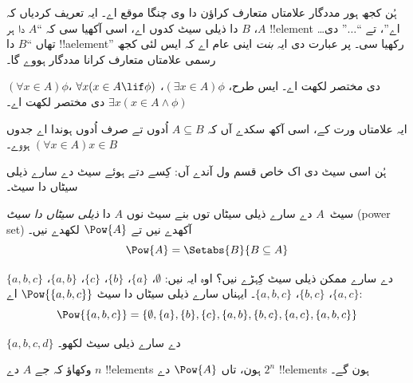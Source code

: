 \documentclass[../../../include/open-logic-section]{subfiles}
\begin{document}
ہُن کجھ ہور مددگار علامتاں متعارف کراؤن دا وی چنگا موقع اے۔ ایہ تعریف
کردیاں کہ $A$، $B$ دا ذیلی سیٹ کدوں اے، اسی آکھیا سی کہ ``$A$ دا ہر
!!{element} \dots اے''، تے ``$\dots$'' دی تھاں ``$B$ دا !!a{element}''
رکھیا سی۔ پر عبارت دی ایہ \emph{بنت} اینی عام اے کہ ایس لئی کجھ رسمی
علامتاں متعارف کرانا مددگار ہووے گا۔

\begin{defn}
$(\forall x \in A)\phi$، $\forall x(x \in A \lif
\phi)$ دی مختصر لکھت اے۔ ایس طرح، $(\exists x \in A)\phi$،
$\exists x(x \in A \land \phi)$ دی مختصر لکھت اے۔
\end{defn}

ایہ علامتاں ورت کے، اسی آکھ سکدے آں کہ $A \subseteq B$ اُدوں تے صرف اُدوں
ہوندا اے جدوں $(\forall x \in A)x \in B$ ہووے۔

ہُن اسی سیٹ دی اک خاص قسم ول آندے آں: کِسے دتے ہوئے سیٹ دے سارے ذیلی
سیٹاں دا سیٹ۔

\begin{defn}
سیٹ~$A$ دے سارے ذیلی سیٹاں توں بنے سیٹ نوں $A$ دا \emph{ذیلی سیٹاں دا سیٹ}
(power set) آکھدے نیں تے $\Pow{A}$ لکھدے نیں۔
  \[
    \Pow{A} = \Setabs{B}{B \subseteq A}
  \]
\end{defn}

\begin{ex}
$\{ a, b, c \}$ دے سارے ممکن ذیلی سیٹ کِہڑے نیں؟ اوہ ایہ نیں:
$\emptyset$، $\{a \}$، $\{b\}$، $\{c\}$، $\{a, b\}$، $\{a, c\}$،
$\{b, c\}$، $\{a, b, c\}$۔ ایہناں سارے ذیلی سیٹاں دا سیٹ
$\Pow{\{a,b,c\}}$ اے:
\[
\Pow{\{ a, b, c \}} = \{\emptyset, \{a \}, \{b\}, \{c\}, \{a, b\},
\{b, c\}, \{a, c\}, \{a, b, c\}\}
\]
\end{ex}

\begin{prob}
$\{a, b, c, d\}$ دے سارے ذیلی سیٹ لکھو۔
\end{prob}

\begin{prob}
وکھاؤ کہ جے $A$ دے $n$ !!{element}s ہون، تاں $\Pow{A}$ دے $2^n$
!!{element}s ہون گے۔
\end{prob}
\end{document}
